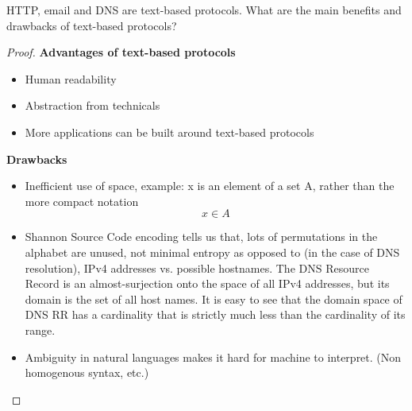 \documentclass[../main.tex]{subfiles}
\begin{document}
\begin{wts}
    HTTP, email and DNS are text-based protocols. What are the main benefits and drawbacks of text-based protocols?
\end{wts}
\begin{proof}
\textbf{Advantages of text-based protocols}
\begin{itemize}
    \item Human readability
    \item Abstraction from technicals
    \item More applications can be built around text-based protocols
\end{itemize}
\textbf{Drawbacks}
\begin{itemize}
    \item Inefficient use of space, example: x is an element of a set A, rather than the more compact notation\[x\in A\]
    \item Shannon Source Code encoding tells us that, lots of permutations in the alphabet are unused, not minimal entropy as opposed to (in the case of DNS resolution), IPv4 addresses vs. possible hostnames. The DNS Resource Record is an almost-surjection onto the space of all IPv4 addresses, but its domain is the set of all host names. It is easy to see that the domain space of DNS RR has a cardinality that is strictly much less than the cardinality of its range.
    \item Ambiguity in natural languages makes it hard for machine to interpret. (Non homogenous syntax, etc.)
\end{itemize}
\end{proof}
\end{document}

